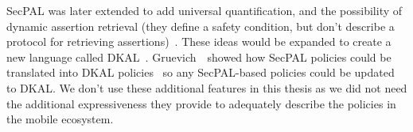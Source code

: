 \documentclass[thesis.tex]{subfiles}
\begin{document}
SecPAL was later extended to add universal quantification, and the
possibility of dynamic assertion retrieval (they define a safety
condition, but don't describe a protocol for retrieving
assertions)~\cite{moritz_y_becker_secpal:_2009}.  These ideas would be
expanded to create a new language called
DKAL~\cite{gurevich_dkal:_2008}.  Gruevich~\etal~showed how SecPAL
policies could be translated into DKAL
policies~\cite{gurevich_dkal:_2008} so any SecPAL-based policies could
be updated to DKAL.  We don't use these additional features in this
thesis as we did not need the additional expressiveness they provide
to adequately describe the policies in the mobile ecosystem.
\end{document}
